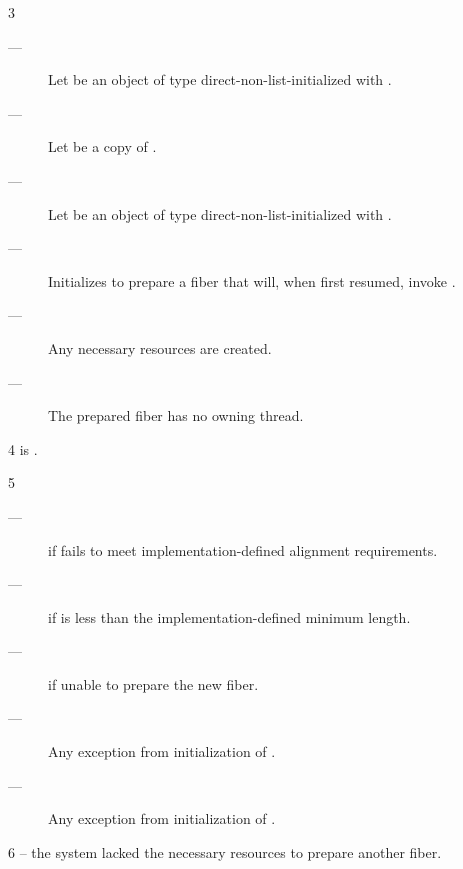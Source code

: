 3 \effects
\begin{description}
    \item[---] Let  be an object of
               type  direct-non-list-initialized
               with . 
    \item[---] Let  be a copy of .
    \item[---] Let  be an object of
               type  direct-non-list-initialized
               with . 
    \item[---] Initializes  to prepare a fiber that will, when
               first resumed, invoke .
    \item[---] Any necessary resources are created.
    \item[---] The prepared fiber has no owning thread.
\end{description}

4 \postcond
\emptyfn is \false.

5 \except
\begin{description}
    \item[---]  if  fails to meet
               implementation-defined alignment requirements.
    \item[---]  if  is less than the
               implementation-defined minimum length.
    \item[---]  if unable to prepare the new fiber.
    \item[---] Any exception from initialization of .
    \item[---] Any exception from initialization of .
\end{description}

6 \errors
{} -- the system lacked the necessary resources to prepare another fiber.

